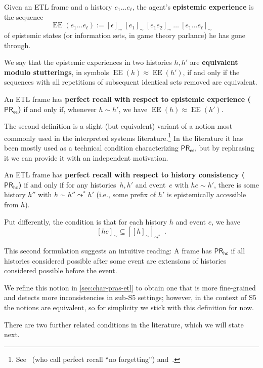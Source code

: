 \documentclass{article}
\newcommand{\PRhc}{\ensuremath{\mathsf{PR_{hc}}}\xspace}
\newcommand{\PRee}{\ensuremath{\mathsf{PR_{ee}}}\xspace}
\def\dfn{\textbf}
\newcommand{\acc}{\sim}
\newcommand{\tiff}{if and only if\xspace}
\newcommand{\mpunct}{\enspace}
\DeclareMathOperator{\EE}{EE}
\newcounter{#1}
\begin{document}
\begin{definition}
  \label{dfn:pr-ee}
  Given an ETL frame and a history $e_1\dots e_\ell$,
  the agent's \dfn{epistemic experience} is the sequence
  \[
  \EE(e_1\dots e_\ell):=[\epsilon]_{\acc}\ [e_1]_{\acc}\ [e_1e_2]_{\acc}\ \dots\ [e_1\dots e_\ell]_{\acc}
  \]
  of epistemic states (or information sets, in game theory parlance) he has gone through.

  We say that the epistemic experiences in two histories $h, h'$ are \dfn{equivalent modulo stutterings},
  in symbols $\EE(h)\approx\EE(h')$,
  \tiff the sequences with all repetitions of subsequent identical sets removed
  are equivalent.

  An ETL frame has \dfn{perfect recall with respect to epistemic experience (\PRee)} \tiff,
  whenever $h\acc h'$, we have $\EE(h)\approx\EE(h')$.
\end{definition}

The second definition is a slight (but equivalent) variant of a notion
most commonly used in the interpreted systems literature.\footnote{See~\cite[p.~204]{halpern_complexity_1989} (who call perfect recall ``no forgetting'')
and~\cite[Proposition~2.1(a)]{van_der_meyden_axioms_1993}.}
In the literature it has been mostly used as a technical condition characterizing \PRee,
but by rephrasing it we can provide it with an independent motivation.
\begin{definition}
  \label{dfn:pr-hc}
  An ETL frame has \dfn{perfect recall with respect to history consistency (\PRhc)} \tiff
  for any histories~$h,h'$ and event~$e$ with $he\acc h'$,
  there is some history $h''$ with $h\acc h''\leadsto^*h'$
  (i.e., some prefix of $h'$ is epistemically accessible from $h$).

  Put differently, the condition is that for each history $h$ and event $e$, we have
  \[
  [he]_\acc\subseteq[[h]_\acc]_{\leadsto^*}\mpunct.
  \]
\end{definition}
This second formulation suggests an intuitive reading:
A frame has \PRhc if all histories considered possible after some event
are extensions of histories considered possible before the event.

We refine this notion in \cref{sec:char-pras-etl}
to obtain one that is more fine-grained and detects more inconsistencies in sub-S5 settings;
however, in the context of S5 the notions are equivalent,
so for simplicity we stick with this definition for now.

\medskip

There are two further related conditions in the literature,
which we will state next.
\end{document}
